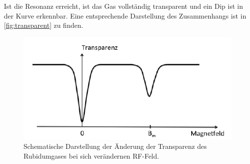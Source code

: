 Ist die Resonanz erreicht, ist das Gas vollständig transparent und ein Dip ist in der Kurve erkennbar. Eine
entsprechende Darstellung des Zusammenhangs ist in \autoref{fig:transparent} zu finden.
\begin{figure}
    \centering
    \includegraphics{transparenz.png}
    \caption{Schematische Darstellung der Änderung der Transparenz des Rubidumgases bei sich verändernen
    RF-Feld. \cite{V21}}
    \label{fig:transparent}
\end{figure}
